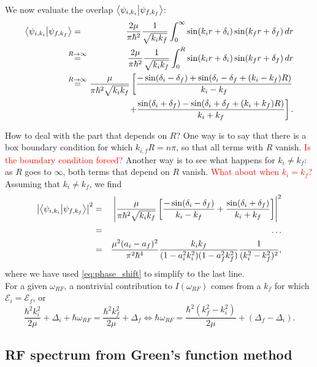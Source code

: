 \documentclass{article}
\theoremstyle{definition}
\newcommand{\f}[2]{\frac{#1}{#2}}
\newcommand{\lb}{\left[}
\newcommand{\rb}{\right]}
\begin{document}
We now evaluate the overlap $\bra{\psi_{i,k_i}} \ket{\psi_{f,k_f}}$:
\begin{eqnarray}
\bra{\psi_{i,k_i}} \ket{\psi_{f,k_f}} 
&=& \f{2\mu}{\pi \hbar^2} \f{1}{\sqrt{k_ik_f}} \int_0^\infty  \sin(k_ir + \delta_i) \sin(k_f r + \delta_f) \,dr \\ 
&\stackrel{\mathclap{\normalfont{R\to \infty}}}{=}& 
\f{2\mu}{\pi \hbar^2} \f{1}{\sqrt{k_ik_f}} \int_0^R  \sin(k_ir + \delta_i) \sin(k_f r + \delta_f) \,dr \\ 
&\stackrel{\mathclap{\normalfont{R\to \infty}}}{=}&  
\f{\mu}{\pi \hbar^2 \sqrt{k_ik_f}} 
\left[ \f{-\sin(\delta_i - \delta_f) + \sin(\delta_i - \delta_f + (k_i - k_f)R)}{k_i - k_f} \right. \nonumber \\
&&\qquad \qquad \left.+ \f{\sin(\delta_i + \delta_f) - \sin(\delta_i + \delta_f + (k_i + k_f)R)}{k_i + k_f} \right].
\end{eqnarray}

How to deal with the part that depends on $R$? One way is to say that there is a box boundary condition for which $k_{i,f} R = n \pi$, so that all terms with $R$ vanish. \textcolor{red}{Is the boundary condition forced?} Another way is to see what happens for $k_i \neq k_f$: as $R$ goes to $\infty$, both terms that depend on $R$ vanish. \textcolor{red}{What about when $k_i = k_f$?}\\

Assuming that $k_i \neq k_f$, we find 
\begin{eqnarray}
\abs{\bra{\psi_{i,k_i}} \ket{\psi_{f,k_f}} }^2
&=& \abs{ \f{\mu}{\pi \hbar^2 \sqrt{k_ik_f}} \lb \f{-\sin(\delta_i - \delta_f)}{k_i - k_f} + \f{\sin(\delta_i + \delta_f)}{k_i + k_f}\rb }^2 \\
&=& \hdots \\
&=& \f{\mu^2 (a_i - a_f)^2}{\pi^2 \hbar^4}  \f{k_i k_f}{(1 - a_i^2k_i^2) (1 - a_f^2 k_f^2)} \f{1}{(k_i^2 - k_f^2)^2},
\end{eqnarray}
where we have used \eqref{eq:phase_shift} to simplify to the last line. \\

For a given $\omega_{RF}$, a nontrivial contribution to $I(\omega_{RF})$ comes from a $k_f$ for which $\mathcal{E}_i = \mathcal{E}_f$, or 
\begin{equation}
\f{\hbar^2 k_i^2}{2\mu} + \Delta_i + \hbar \omega_{RF} = \f{\hbar^2 k_f^2}{2\mu} + \Delta_f \iff \hbar \omega_{RF} = \f{\hbar^2 (k_f^2 - k_i^2)}{2\mu} + (\Delta_f - \Delta_i).
\end{equation}


\subsection{RF spectrum from Green's function method}




 
	
\end{document}
